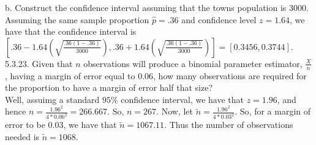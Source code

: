 \documentclass[12pt]{article}
\begin{document}
b. Construct the confidence interval assuming that the towns population is 3000.\\
Assuming the same sample proportion $\hat{p}=.36$ and confidence level $z=1.64$, we have that the confidence interval is $[.36-1.64(\sqrt{\frac{.36(1-.36)}{3000}}), .36+1.64(\sqrt{\frac{.36(1-.36)}{3000}})]=[0.3456, 0.3744]$. \\[20pt]

5.3.23. Given that $n$ observations will produce a binomial parameter estimator, $\frac{X}{n}$, having a margin of error equal to 0.06, how many observations are required for the proportion to have a margin of error half that size?\\
Well, assuimg a standard $95\%$ confidence interval, we have that $z=1.96$, and hence $n=\frac{1.96^2}{4*0.06^2}=266.667$. So, $n=267$. Now, let $\tilde{n}=\frac{1.96^2}{4*0.03^2}$. So, for a margin of error to be 0.03, we have that $\tilde{n}=1067.11$. Thus the number of observations needed is $\tilde{n}=1068$.\\
\end{document}
